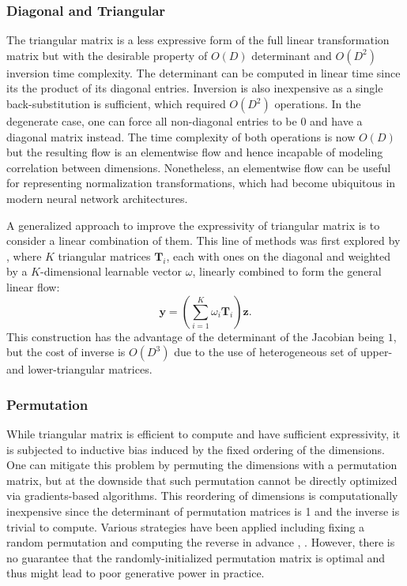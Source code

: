 \subsubsection{Diagonal and Triangular}

The triangular matrix is a less expressive form of the full linear
transformation matrix but with the desirable property of $O(D)$ determinant and
$O(D^2)$ inversion time complexity. The determinant can be computed in linear
time since its the product of its diagonal entries. Inversion is also
inexpensive as a single back-substitution is sufficient, which required $O(D^2)$
operations. In the degenerate case, one can force all non-diagonal entries to be
$0$ and have a diagonal matrix instead. The time complexity of both operations
is now $O(D)$ but the resulting flow is an elementwise flow and hence incapable
of modeling correlation between dimensions. Nonetheless, an elementwise flow can
be useful for representing normalization transformations, which had become
ubiquitous in modern neural network architectures.

A generalized approach to improve the expressivity of triangular matrix is to
consider a linear combination of them. This line of methods was first explored by
\cite{tomczakImprovingVariationalAutoEncoders2017}, where $K$ triangular
matrices $\mathbf{T}_i$, each with ones on the diagonal and weighted by a
$K$-dimensional learnable vector $\omega$, linearly combined to form the
general linear flow:
$$
\mathbf{y} = \left(\sum_{i=1}^K \omega_i \mathbf{T}_i\right)\mathbf{z}
.$$
This construction has the advantage of the determinant of the Jacobian being
$1$, but the cost of inverse is $O(D^3)$ due to the use of heterogeneous set of upper-
and lower-triangular matrices.

\subsubsection{Permutation}
While triangular matrix is efficient to compute and have sufficient
expressivity, it is subjected to inductive bias induced by the fixed ordering of
the dimensions. One can mitigate this problem by permuting the dimensions with a
permutation matrix, but at the downside that such permutation cannot be directly
optimized via gradients-based algorithms. This reordering of dimensions is
computationally inexpensive since the determinant of permutation matrices is 1
and the inverse is trivial to compute. Various strategies have been applied
including fixing a random permutation and computing the reverse in advance
\cite{dinhDensityEstimationUsing2017}, \cite{kingmaGlowGenerativeFlow2018}.
However, there is no guarantee that the randomly-initialized permutation matrix
is optimal and thus might lead to poor generative power in practice.

